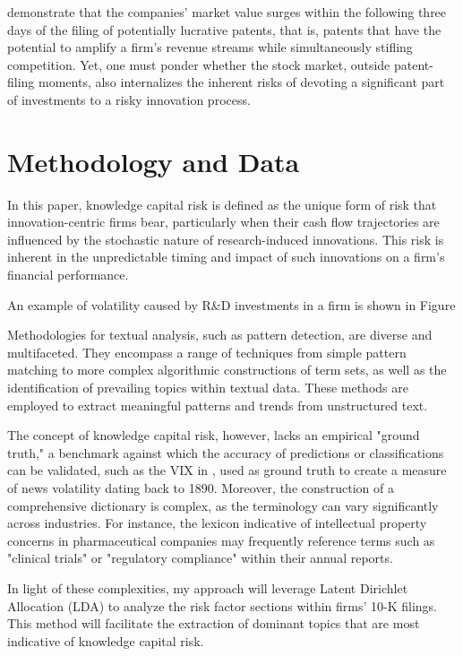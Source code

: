 \documentclass[12pt, letterpaper]{article}
\begin{document}
\citet{Kogan2017-fx} demonstrate that the companies' market value surges within the following three days of the filing of potentially lucrative patents, that is, patents that have the potential to amplify a firm's revenue streams while simultaneously stifling competition. Yet, one must ponder whether the stock market, outside patent-filing moments, also internalizes the inherent risks of devoting a significant part of investments to a risky innovation process.

\section{Methodology and Data}


In this paper, knowledge capital risk is defined as the unique form of risk that innovation-centric firms bear, particularly when their cash flow trajectories are influenced by the stochastic nature of research-induced innovations. This risk is inherent in the unpredictable timing and impact of such innovations on a firm's financial performance.

An example of volatility caused by R\&D investments in a firm is shown in Figure 


Methodologies for textual analysis, such as pattern detection, are diverse and multifaceted. They encompass a range of techniques from simple pattern matching to more complex algorithmic constructions of term sets, as well as the identification of prevailing topics within textual data. These methods are employed to extract meaningful patterns and trends from unstructured text.

The concept of knowledge capital risk, however, lacks an empirical "ground truth," a benchmark against which the accuracy of predictions or classifications can be validated, such as the VIX in \cite{Manela2017-lj}, used as ground truth to create a measure of news volatility dating back to 1890. Moreover, the construction of a comprehensive dictionary is complex, as the terminology can vary significantly across industries. For instance, the lexicon indicative of intellectual property concerns in pharmaceutical companies may frequently reference terms such as "clinical trials" or "regulatory compliance" within their annual reports.

In light of these complexities, my approach will leverage Latent Dirichlet Allocation (LDA) to analyze the risk factor sections within firms' 10-K filings. This method will facilitate the extraction of dominant topics that are most indicative of knowledge capital risk. 
\end{document}
